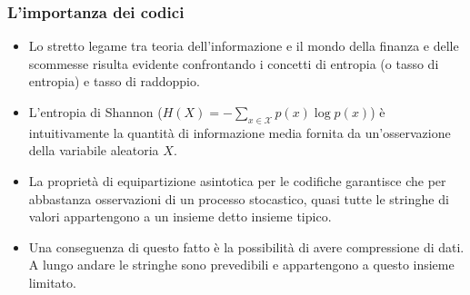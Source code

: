 \documentclass{beamer}
\theoremstyle{plain}
\theoremstyle{definition}
\theoremstyle{remark}
\begin{document}
\begin{frame}
\frametitle{L'importanza dei codici}
\begin{itemize}
\item Lo stretto legame tra teoria dell'informazione e il mondo della finanza e delle scommesse risulta evidente confrontando i concetti di entropia (o tasso di entropia) e tasso di raddoppio.
\item L'entropia di Shannon ($H(X)=-\sum_{x\in\mathcal{X}}p(x)\log p(x)$) è intuitivamente la quantità di informazione media fornita da un'osservazione della variabile aleatoria $X$.
\item La proprietà di equipartizione asintotica per le codifiche \cite{CTElInfTeo} garantisce che per abbastanza osservazioni di un processo stocastico, quasi tutte le stringhe di valori appartengono a un insieme detto insieme tipico.
\item Una conseguenza di questo fatto è la possibilità di avere compressione di dati. A lungo andare le stringhe sono prevedibili e appartengono a questo insieme limitato. 
\end{itemize}
\end{frame}
\end{document}
